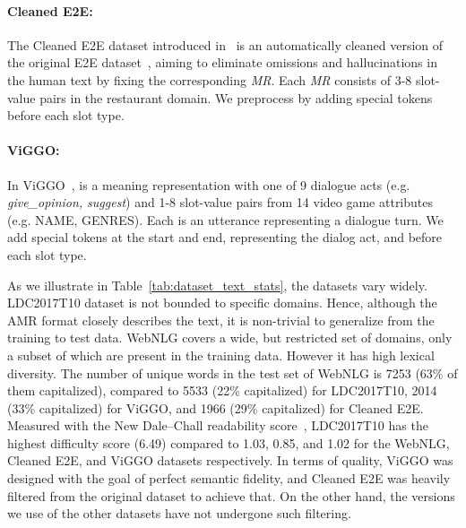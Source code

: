\documentclass[11pt]{article}
\newcommand{\webnlg}{WebNLG\xspace}
\newcommand{\ldc}{LDC2017T10\xspace}
\newcommand{\viggo}{ViGGO\xspace}
\newcommand{\cleanedee}{Cleaned E2E\xspace}
\newcommand{\mr}{\textit{MR}\xspace}
\theoremstyle{definition}
\theoremstyle{break}
\begin{document}
\paragraph{\cleanedee:} The \cleanedee dataset introduced in~\cite{Dusek2019} is an automatically cleaned version of the original E2E dataset~\cite{novikova2017e2e}, aiming to eliminate omissions and hallucinations in the human text by fixing the corresponding \mr. Each \mr consists of 3-8 slot-value pairs in the restaurant domain. We preprocess  by adding special tokens before each slot type. 


\paragraph{\viggo:} In \viggo~\cite{juraska2019viggo},  is a meaning representation with one of 9 dialogue acts (e.g. \textit{give\_opinion, suggest}) and 1-8 slot-value pairs from 14 video game attributes (e.g. NAME, GENRES). Each  is an utterance representing a dialogue turn. We add special tokens at the start and end, representing the dialog act, and before each slot type.

As we illustrate in Table~\ref{tab:dataset_text_stats}, the datasets vary widely. \ldc dataset is not bounded to specific domains. Hence, although the AMR format closely describes the text, it is non-trivial to generalize from the training to test data. \webnlg covers a wide, but restricted set of domains, only a subset of which are present in the training data.
However it has high lexical diversity. The number of unique words in the test set of \webnlg is 7253 (63\% of them capitalized), compared to 5533 (22\% capitalized) for \ldc, 2014 (33\% capitalized) for \viggo, and 1966 (29\% capitalized) for \cleanedee. Measured with the New Dale–Chall readability score~\cite{dale1948formula}, \ldc has the highest difficulty score (6.49) compared to 1.03, 0.85, and 1.02 for the \webnlg, \cleanedee, and \viggo datasets respectively. 
In terms of quality, \viggo was designed with the goal of perfect semantic fidelity, and \cleanedee was heavily filtered from the original dataset to achieve that. On the other hand, the versions we use of the other datasets have not undergone such filtering.
\end{document}
